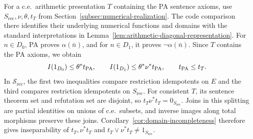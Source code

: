 For a c.e.\ arithmetic presentation $T$ containing the PA sentence
axioms, use $S_{\mathrm{rec}},\nu,\theta,t_T$ from
Section~\ref{subsec:numerical-realization}. The code comparison there
identifies their underlying numerical functions and domains with
the standard interpretations in
Lemma~\ref{lem:arithmetic-diagonal-representation}. For $n\in D_0$, PA proves $\alpha(\bar n)$, and for $n\in D_1$, it
proves $\neg\alpha(\bar n)$. Since $T$ contains the PA axioms, we obtain
\begin{equation}\label{eq:arithmetic-domain-inclusions}
 I(1_{D_0})\le\theta^*t_{\mathrm{PA}},\qquad
 I(1_{D_1})\le\theta^*\nu^*t_{\mathrm{PA}},\qquad t_{\mathrm{PA}}\le t_T.
\end{equation}
In $\mathscr S_{\mathrm{rec}}$, the first two inequalities compare restriction
idempotents on $E$ and the third compares restriction idempotents on
$S_{\mathrm{rec}}$.
For consistent $T$, its sentence theorem set and refutation set
are disjoint, so $t_T\nu^*t_T=0_{S_{\mathrm{rec}}}$.
Joins in this splitting are partial identities on unions of c.e.\ subsets,
and inverse images along total morphisms preserve these joins. Corollary~\ref{cor:domain-incompleteness}
therefore gives inseparability of $t_T,\nu^*t_T$ and
$t_T\vee\nu^*t_T\ne1_{S_{\mathrm{rec}}}$.

